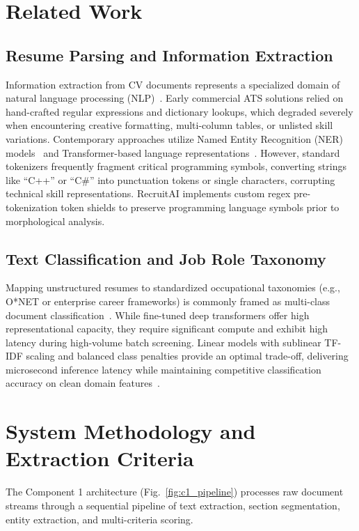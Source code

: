 \documentclass[conference]{IEEEtran}
\begin{document}
\section{Related Work}
\subsection{Resume Parsing and Information Extraction}
Information extraction from CV documents represents a specialized domain of natural language processing (NLP)~\cite{jurafsky2023speech}. Early commercial ATS solutions relied on hand-crafted regular expressions and dictionary lookups, which degraded severely when encountering creative formatting, multi-column tables, or unlisted skill variations. Contemporary approaches utilize Named Entity Recognition (NER) models~\cite{manning2014stanford} and Transformer-based language representations~\cite{vaswani2017attention, devlin2019bert}. However, standard tokenizers frequently fragment critical programming symbols, converting strings like ``C++'' or ``C\#'' into punctuation tokens or single characters, corrupting technical skill representations. RecruitAI implements custom regex pre-tokenization token shields to preserve programming language symbols prior to morphological analysis.

\subsection{Text Classification and Job Role Taxonomy}
Mapping unstructured resumes to standardized occupational taxonomies (e.g., O*NET or enterprise career frameworks) is commonly framed as multi-class document classification~\cite{zhang2023job}. While fine-tuned deep transformers offer high representational capacity, they require significant compute and exhibit high latency during high-volume batch screening. Linear models with sublinear TF-IDF scaling and balanced class penalties provide an optimal trade-off, delivering microsecond inference latency while maintaining competitive classification accuracy on clean domain features~\cite{pedregosa2011scikit}.

\section{System Methodology and Extraction Criteria}
The Component 1 architecture (Fig.~\ref{fig:c1_pipeline}) processes raw document streams through a sequential pipeline of text extraction, section segmentation, entity extraction, and multi-criteria scoring.
\end{document}
